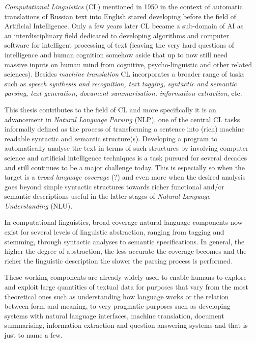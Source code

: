 \textit{Computational Linguistics} (CL) mentioned in 1950 in the context of automatic translations \citep{Hutchins1999} of Russian text into English stared developing before the field of Artificial Intelligence. Only a few years later CL became a sub-domain of AI as an interdisciplinary field dedicated to developing algorithms and computer software for intelligent processing of text (leaving the very hard questions of intelligence and human cognition somehow aside that up to now still need massive inputs on human mind from cognitive, psycho-linguistic and other related sciences). Besides \textit{machine translation} CL incorporates a broader range of tasks such as \textit{speech synthesis and recognition, text tagging, syntactic and semantic parsing, text generation, document summarisation, information extraction}, etc. 

This thesis contributes to the field of CL and more specifically it is an advancement in \textit{Natural Language Parsing} (NLP), one of the central CL tasks informally defined as the process of transforming a sentence into (rich) machine readable syntactic and semantic structure(s). Developing a program to automatically analyse the text in terms of such structures by involving computer science and artificial intelligence techniques is a task pursued for several decades and still continues to be a major challenge today. This is especially so when the target is a \textit{broad language coverage} (?) and even more when the desired analysis goes beyond simple syntactic structures towards richer functional and/or semantic descriptions useful in the latter stages of \textit{Natural Language Understanding} (NLU). 

In computational linguistics, broad coverage natural language components now exist for several levels of linguistic abstraction, ranging from tagging and stemming, through syntactic analyses to semantic specifications. In general, the higher the degree of abstraction, the less accurate the coverage becomes and the richer the linguistic description the slower the parsing process is performed. 

These working components are already widely used to enable humans to explore and exploit large quantities of textual data for purposes that vary from the most theoretical ones such as understanding how language works or the relation between form and meaning, to very pragmatic purposes such as developing systems with natural language interfaces, machine translation, document summarising, information extraction and question answering systems and that is just to name a few. 

